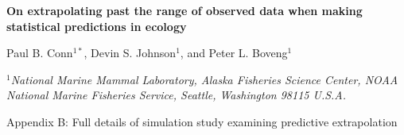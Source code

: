 \documentclass[12pt,fleqn]{article}
\begin{document}
\begin{center} \bf {\large On extrapolating past the range of observed data when making statistical predictions in ecology}

\vspace{0.7cm}
Paul B. Conn$^{1*}$, Devin S. Johnson$^1$, and Peter L. Boveng$^1$
\end{center}
\vspace{0.5cm}

\rm
\small

\it $^1$National Marine Mammal Laboratory, Alaska Fisheries Science Center,
NOAA National Marine Fisheries Service,
Seattle, Washington 98115 U.S.A.\\

\rm \begin{flushleft}

\raggedbottom
\vspace{.5in}

\begin{center}
Appendix B: Full details of simulation study examining predictive extrapolation
\bigskip
\end{center}
\vspace{.3in}

\doublespacing


\end{flushleft}
\end{document}
